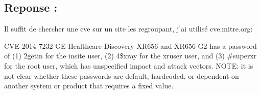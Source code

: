 \documentclass{article}
\begin{document}
    \subsection{Reponse :}
        Il suffit de chercher une cve sur un site les regroupant, j’ai utilisé cve.mitre.org:

        CVE-2014-7232 		GE Healthcare Discovery XR656 and XR656 G2 has a password of (1) 2getin for the insite user, (2) 4\$xray for the xruser user, and (3) \#superxr for the root user, which has unspecified impact and attack vectors. NOTE: it is not clear whether these passwords are default, hardcoded, or dependent on another system or product that requires a fixed value.
\end{document}
